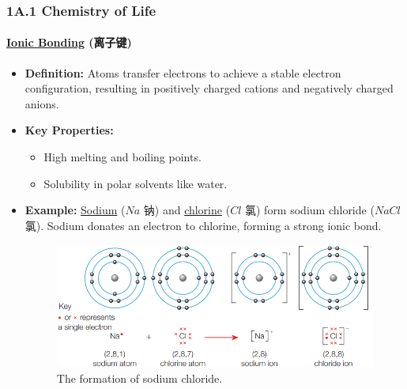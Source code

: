 
\subsubsection{1A.1 Chemistry of Life}
\paragraph{\underline{Ionic Bonding} (离子键)}
\begin{itemize}
    \item \textbf{Definition:} Atoms transfer electrons to achieve a stable electron configuration, resulting in positively
    charged cations and negatively charged anions.
    \item \textbf{Key Properties:}
    \begin{itemize}
        \item High melting and boiling points.
        \item Solubility in polar solvents like water.
    \end{itemize}
    \item \textbf{Example:} \underline{Sodium} ($Na$ 钠) and \underline{chlorine} ($Cl$ 氯) form sodium chloride ($NaCl$ 氯).
    Sodium donates an electron to chlorine, forming a strong ionic bond.
    \begin{figure}[H]
        \centering
        \includegraphics[scale=0.8]{Biology/1A/Images/1A-1-1.png}
        \caption{The formation of sodium chloride.}
    \end{figure}
\end{itemize}


